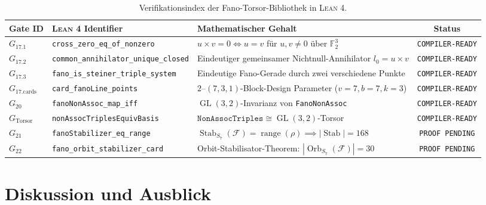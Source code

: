\documentclass[11pt,a4paper]{article}
\theoremstyle{remark}
\begin{document}
	\begin{table}[htbp]
		\centering
		\small
		\caption{Verifikationsindex der Fano-Torsor-Bibliothek in \textsc{Lean 4}.}
		\label{tab:lean_gate_status}
		\begin{tabular}{lllc}
			\toprule
			\textbf{Gate ID} & \textbf{\textsc{Lean 4} Identifier} & \textbf{Mathematischer Gehalt} & \textbf{Status} \\
			\midrule
			$G_{17.1}$ & \texttt{cross\_zero\_eq\_of\_nonzero} & $u \times v = 0 \iff u=v$ für $u,v \neq 0$ über $\mathbb{F}_2^3$ & \texttt{COMPILER-READY} \\
			$G_{17.2}$ & \texttt{common\_annihilator\_unique\_closed} & Eindeutiger gemeinsamer Nichtnull-Annihilator $l_0 = u \times v$ & \texttt{COMPILER-READY} \\
			$G_{17.3}$ & \texttt{fano\_is\_steiner\_triple\_system} & Eindeutige Fano-Gerade durch zwei verschiedene Punkte & \texttt{COMPILER-READY} \\
			$G_{17.\text{cards}}$ & \texttt{card\_fanoLine\_points} & $2\text{--}(7, 3, 1)$-Block-Design Parameter ($v=7, b=7, k=3$) & \texttt{COMPILER-READY} \\
			$G_{20}$ & \texttt{fanoNonAssoc\_map\_iff} & $\operatorname{GL}(3,2)$-Invarianz von \texttt{FanoNonAssoc} & \texttt{COMPILER-READY} \\
			$G_{\text{Torsor}}$ & \texttt{nonAssocTriplesEquivBasis} & $\texttt{NonAssocTriples} \cong \operatorname{GL}(3,2)$-Torsor & \texttt{COMPILER-READY} \\
			$G_{21}$ & \texttt{fanoStabilizer\_eq\_range} & $\operatorname{Stab}_{S_7}(\mathcal{F}) = \operatorname{range}(\rho) \implies |\operatorname{Stab}| = 168$ & \texttt{PROOF PENDING} \\
			$G_{22}$ & \texttt{fano\_orbit\_stabilizer\_card} & Orbit-Stabilisator-Theorem: $|\operatorname{Orb}_{S_7}(\mathcal{F})| = 30$ & \texttt{PROOF PENDING} \\
			\bottomrule
		\end{tabular}
	\end{table}
	
	\section{Diskussion und Ausblick}
	
\end{document}
